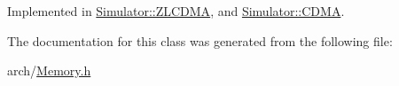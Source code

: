 Implemented in \hyperlink{class_simulator_1_1_z_l_c_d_m_a_a8c6a79696a2c98b91c3d76dbf4702a75}{Simulator\+::\+Z\+L\+C\+D\+M\+A}, and \hyperlink{class_simulator_1_1_c_d_m_a_a959009cf2b4a9e3bbcf0ffb4aba8aa70}{Simulator\+::\+C\+D\+M\+A}.



The documentation for this class was generated from the following file\+:\begin{DoxyCompactItemize}
\item 
arch/\hyperlink{_memory_8h}{Memory.\+h}\end{DoxyCompactItemize}
